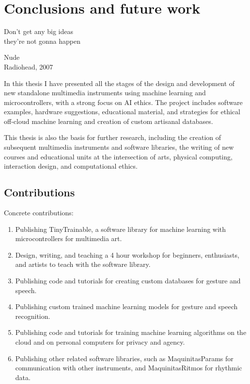 \chapter{Conclusions and future work}

\epigraph{Don't get any big ideas \\ they're not gonna happen}{Nude \\ Radiohead, 2007}

In this thesis I have presented all the stages of the design and development of new standalone multimedia instruments using machine learning and microcontrollers, with a strong focus on AI ethics. The project includes software examples, hardware suggestions, educational material, and strategies for ethical off-cloud machine learning and creation of custom artisanal databases.

This thesis is also the basis for further research, including the creation of subsequent multimedia instruments and software libraries, the writing of new courses and educational units at the intersection of arts, physical computing, interaction design, and computational ethics.

\section{Contributions}

Concrete contributions:

\begin{enumerate}
  \item Publishing TinyTrainable, a software library for machine learning with microcontrollers for multimedia art.
  \item Design, writing, and teaching a 4 hour workshop for beginners, enthusiasts, and artists to teach with the software library.
  \item Publishing code and tutorials for creating custom databases for gesture and speech.
  \item Publishing custom trained machine learning models for gesture and speech recognition.
  \item Publishing code and tutorials for training machine learning algorithms on the cloud and on personal computers for privacy and agency.
  \item Publishing other related software libraries, such as MaquinitasParams for communication with other instruments, and MaquinitasRitmos for rhythmic data.
\end{enumerate}

